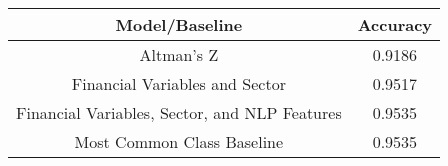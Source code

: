 \footnotesize
\begin{tabular}{cc}
\toprule
Model/Baseline & Accuracy \\
\midrule
Altman's Z & 0.9186 \\
Financial Variables and Sector & 0.9517 \\
Financial Variables, Sector, and NLP Features & 0.9535 \\
Most Common Class Baseline & 0.9535 \\
\bottomrule
\end{tabular}

\normalsize